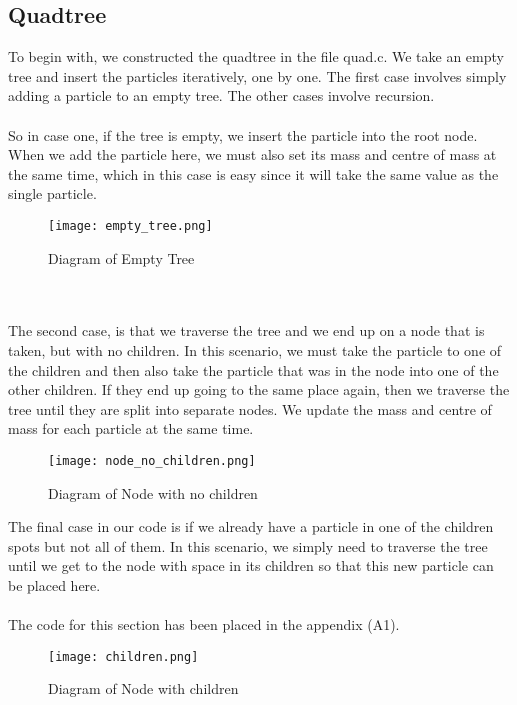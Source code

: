 \documentclass{article}
\begin{document}
\subsection{Quadtree}
To begin with, we constructed the quadtree in the file quad.c. We take an empty tree and insert the particles iteratively, one by one. The first case involves simply adding a particle to an empty tree. The other cases involve recursion. 
\\\\
So in case one, if the tree is empty, we insert the particle into the root node. When we add the particle here, we must also set its mass and centre of mass at the same time, which in this case is easy since it will take the same value as the single particle. 
\begin{figure}[htb]
\begin{center}
\texttt{[image: empty\_tree.png]}
\caption{Diagram of Empty Tree}
\end{center}
\end{figure}
\\\\
The second case, is that we traverse the tree and we end up on a node that is taken, but with no children. In this scenario, we must take the particle to one of the children and then also take the particle that was in the node into one of the other children. If they end up going to the same place again, then we traverse the tree until they are split into separate nodes. We update the mass and centre of mass for each particle at the same time. 
\begin{figure}[htb]
\begin{center}
\texttt{[image: node\_no\_children.png]}
\caption{Diagram of Node with no children}
\end{center}
\end{figure}
The final case in our code is if we already have a particle in one of the children spots but not all of them. In this scenario, we simply need to traverse the tree until we get to the node with space in its children so that this new particle can be placed here. 
\\\\
The code for this section has been placed in the appendix (A1).
\begin{figure}[htb]
\begin{center}
\texttt{[image: children.png]}
\caption{Diagram of Node with children}
\end{center}
\end{figure}
\\\\
\newpage
\end{document}
